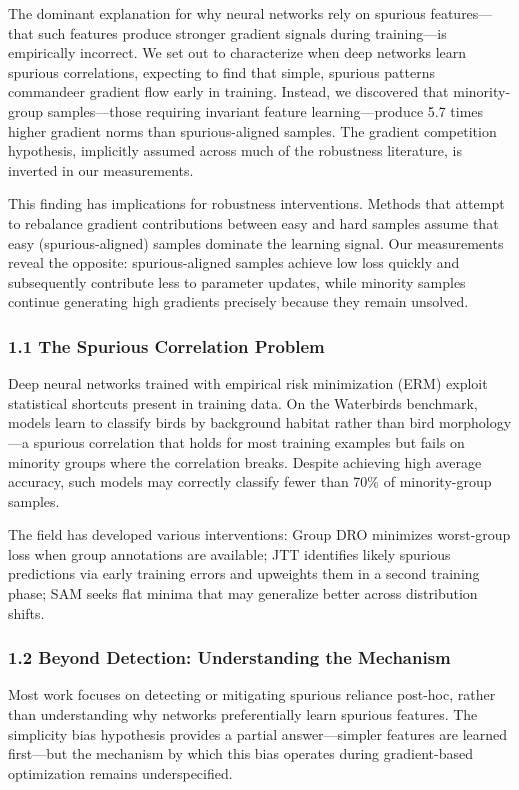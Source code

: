 
The dominant explanation for why neural networks rely on spurious features---that such features produce stronger gradient signals during training---is empirically incorrect. We set out to characterize when deep networks learn spurious correlations, expecting to find that simple, spurious patterns commandeer gradient flow early in training. Instead, we discovered that minority-group samples---those requiring invariant feature learning---produce 5.7 times higher gradient norms than spurious-aligned samples. The gradient competition hypothesis, implicitly assumed across much of the robustness literature, is inverted in our measurements.

This finding has implications for robustness interventions. Methods that attempt to rebalance gradient contributions between easy and hard samples assume that easy (spurious-aligned) samples dominate the learning signal. Our measurements reveal the opposite: spurious-aligned samples achieve low loss quickly and subsequently contribute less to parameter updates, while minority samples continue generating high gradients precisely because they remain unsolved.

\subsubsection{1.1 The Spurious Correlation Problem}

Deep neural networks trained with empirical risk minimization (ERM) exploit statistical shortcuts present in training data. On the Waterbirds benchmark, models learn to classify birds by background habitat rather than bird morphology---a spurious correlation that holds for most training examples but fails on minority groups where the correlation breaks. Despite achieving high average accuracy, such models may correctly classify fewer than 70\% of minority-group samples.

The field has developed various interventions: Group DRO minimizes worst-group loss when group annotations are available; JTT identifies likely spurious predictions via early training errors and upweights them in a second training phase; SAM seeks flat minima that may generalize better across distribution shifts.

\subsubsection{1.2 Beyond Detection: Understanding the Mechanism}

Most work focuses on detecting or mitigating spurious reliance post-hoc, rather than understanding why networks preferentially learn spurious features. The simplicity bias hypothesis provides a partial answer---simpler features are learned first---but the mechanism by which this bias operates during gradient-based optimization remains underspecified.


